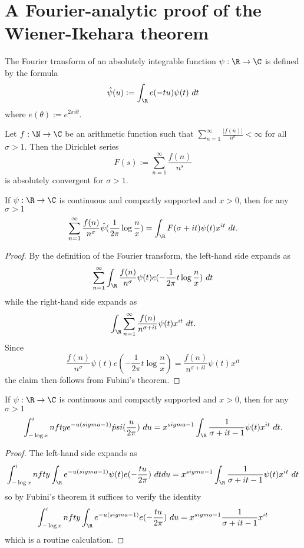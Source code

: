 \chapter{A Fourier-analytic proof of the Wiener-Ikehara theorem}

The Fourier transform of an absolutely integrable function $\psi: \R \to \C$ is defined by the formula
$$ \hat \psi(u) := \int_\R e(-tu) \psi(t)\ dt$$
where $e(\theta) := e^{2\pi i \theta}$.

Let $f: \N \to \C$ be an arithmetic function such that $\sum_{n=1}^\infty \frac{|f(n)|}{n^\sigma} < \infty$ for all $\sigma>1$.  Then the Dirichlet series
$$ F(s) := \sum_{n=1}^\infty \frac{f(n)}{n^s}$$
is absolutely convergent for $\sigma>1$.

\begin{lemma}\label{first-fourier}  If $\psi: \R \to \C$ is continuous and compactly supported and $x > 0$, then for any $\sigma>1$
  $$ \sum_{n=1}^\infty \frac{f(n)}{n^\sigma} \hat \psi( \frac{1}{2\pi} \log \frac{n}{x} ) = \int_\R F(\sigma + it) \psi(t) x^{it}\ dt.$$
\end{lemma}

\begin{proof}  By the definition of the Fourier transform, the left-hand side expands as
$$ \sum_{n=1}^\infty \int_\R \frac{f(n)}{n^\sigma} \psi(t) e( - \frac{1}{2\pi} t \log \frac{n}{x})\ dt$$
while the right-hand side expands as
$$ \int_\R \sum_{n=1}^\infty \frac{f(n)}{n^{\sigma+it}} \psi(t) x^{it}\ dt.$$
Since
$$\frac{f(n)}{n^\sigma} \psi(t) e( - \frac{1}{2\pi} t \log \frac{n}{x}) = \frac{f(n)}{n^{\sigma+it}} \psi(t) x^{it}$$
the claim then follows from Fubini's theorem.
\end{proof}

\begin{lemma}\label{second-fourier} If $\psi: \R \to \C$ is continuous and compactly supported and $x > 0$, then for any $\sigma>1$
$$ \int_{-\log x}^infty e^{-u(sigma-1)} \hat psi(\frac{u}{2\pi})\ du = x^{sigma - 1} \int_\R \frac{1}{\sigma+it-1} \psi(t) x^{it}\ dt.$$
\end{lemma}

\begin{proof}  The left-hand side expands as
  $$ \int_{-\log x}^infty \int_\R e^{-u(sigma-1)} \psi(t) e(-\frac{tu}{2\pi})\ dt du = x^{sigma - 1} \int_\R \frac{1}{\sigma+it-1} \psi(t) x^{it}\ dt$$
  so by Fubini's theorem it suffices to verify the identity
$$ \int_{-\log x}^infty \int_\R e^{-u(sigma-1)} e(-\frac{tu}{2\pi})\ du = x^{sigma - 1} \frac{1}{\sigma+it-1} x^{it}$$
which is a routine calculation.
\end{proof}

